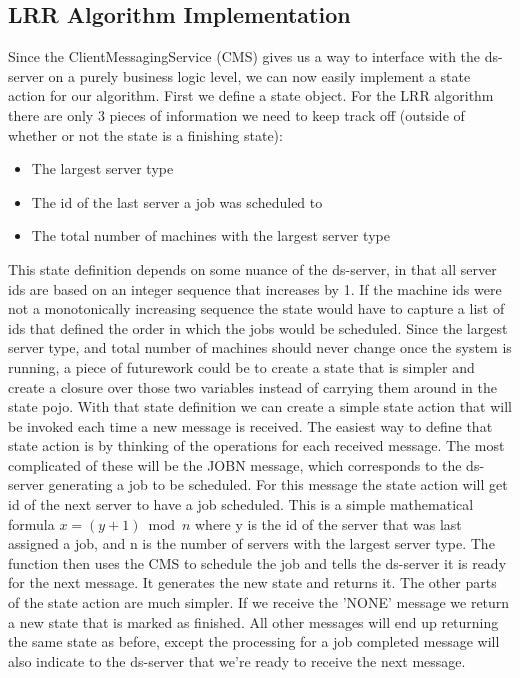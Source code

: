 \documentclass[12pt, letterpaper]{article}
\begin{document}
\subsection*{LRR Algorithm Implementation}
Since the ClientMessagingService (CMS) gives us a way to interface with the ds-server on a purely business logic level, we can now easily implement a state action for our algorithm.
First we define a state object. For the LRR algorithm there are only 3 pieces of information we need to keep track off (outside of whether or not the state is a finishing state):
\begin{itemize}
    \item The largest server type
    \item The id of the last server a job was scheduled to
    \item The total number of machines with the largest server type
\end{itemize}
This state definition depends on some nuance of the ds-server, in that all server ids are based on an integer sequence that increases by 1. 
If the machine ids were not a monotonically increasing sequence the state would have to capture a list of ids that defined the order in which the jobs would be scheduled.
Since the largest server type, and total number of machines should never change once the system is running, a piece of futurework could be to create a state that is simpler and create a closure over those two variables instead of carrying them around in the state pojo.
\newline
With that state definition we can create a simple state action that will be invoked each time a new message is received. 
The easiest way to define that state action is by thinking of the operations for each received message. The most complicated of these will be the JOBN message, which corresponds to the ds-server generating a job to be scheduled.
For this message the state action will get id of the next server to have a job scheduled. This is a simple mathematical formula 
\begin{math}
    x = (y + 1) \bmod n
\end{math}
where y is the id of the server that was last assigned a job, and n is the number of servers with the largest server type.
The function then uses the CMS to schedule the job and tells the ds-server it is ready for the next message.
It generates the new state and returns it.
\newline
The other parts of the state action are much simpler. If we receive the 'NONE' message we return a new state that is marked as finished.
All other messages will end up returning the same state as before, except the processing for a job completed message will also indicate to the ds-server that we're ready to receive the next message.
\end{document}
